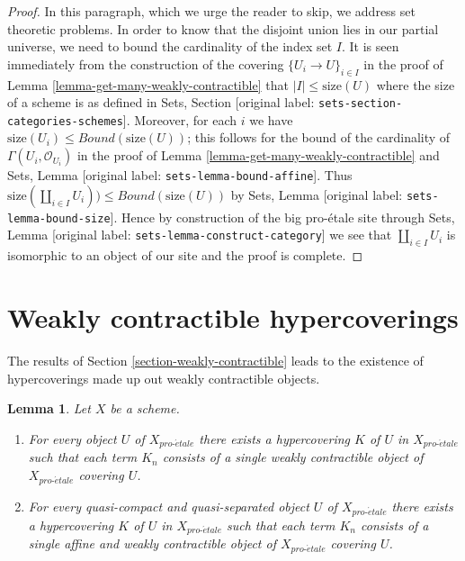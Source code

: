 \documentclass[10pt,a4paper]{article}
\theoremstyle{plain}
\newtheorem{lemma}[subsection]{Lemma}
\theoremstyle{definition}
\theoremstyle{remark}
\numberwithin{equation}{subsection}
\def\proetale{{pro\text{-}\acute{e}tale}}
\begin{document}
\begin{proof}
\medskip\noindent
In this paragraph, which we urge the reader to skip, we address
set theoretic problems. In order to know that the disjoint union
lies in our partial universe, we need to bound the cardinality of
the index set $I$. It is seen immediately from the construction of
the covering $\{U_i \to U\}_{i \in I}$ in the proof of
Lemma \ref{lemma-get-many-weakly-contractible}
that $|I| \leq \text{size}(U)$ where the size of a scheme is as
defined in Sets, Section \textnormal{[original label: \nolinkurl{sets-section-categories-schemes}]}.
Moreover, for each $i$ we have
$\text{size}(U_i) \leq Bound(\text{size}(U))$;
this follows for the bound of the cardinality of
$\Gamma(U_i, \mathcal{O}_{U_i})$ in
the proof of Lemma \ref{lemma-get-many-weakly-contractible}
and Sets, Lemma \textnormal{[original label: \nolinkurl{sets-lemma-bound-affine}]}.
Thus $\text{size}(\coprod_{i \in I} U_i)) \leq Bound(\text{size}(U))$
by Sets, Lemma \textnormal{[original label: \nolinkurl{sets-lemma-bound-size}]}.
Hence by construction of the big pro-\'etale site through
Sets, Lemma \textnormal{[original label: \nolinkurl{sets-lemma-construct-category}]}
we see that $\coprod_{i \in I} U_i$ is isomorphic to an object
of our site and the proof is complete.
\end{proof}






\section{Weakly contractible hypercoverings}
\label{section-hypercovering}

\noindent
The results of Section \ref{section-weakly-contractible}
leads to the existence of hypercoverings made up out weakly
contractible objects.

\begin{lemma}
\label{lemma-w-contractible-hypercovering}
Let $X$ be a scheme.
\begin{enumerate}
\item For every object $U$ of $X_\proetale$ there exists a hypercovering
$K$ of $U$ in $X_\proetale$ such that each term $K_n$ consists of a
single weakly contractible object of $X_\proetale$ covering $U$.
\item For every quasi-compact and quasi-separated object $U$ of $X_\proetale$
there exists a hypercovering $K$ of $U$ in $X_\proetale$ such that each
term $K_n$ consists of a single affine and weakly contractible object of
$X_\proetale$ covering $U$.
\end{enumerate}
\end{lemma}
\end{document}
